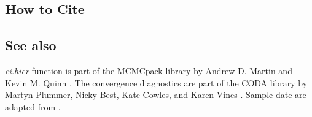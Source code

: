 \subsection*{How to Cite}


\subsection*{See also}
\emph{ei.hier} function is part of the MCMCpack library by Andrew D. Martin and Kevin M. Quinn \citep{MarQui05}.
The convergence diagnostics are part of the CODA library by Martyn Plummer, Nicky Best, Kate Cowles, and Karen Vines \citep{PluBesCowVin05}. Sample date are adapted from \cite{MarQui05}.
